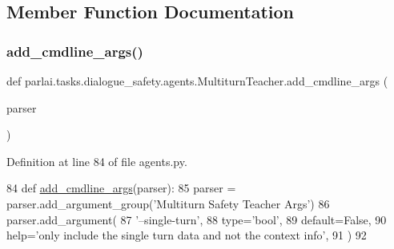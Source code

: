 \subsection{Member Function Documentation}
\mbox{\label{classparlai_1_1tasks_1_1dialogue__safety_1_1agents_1_1MultiturnTeacher_aa7d5691d1e80f9104f21698b8348b55e}} 
\subsubsection{\texorpdfstring{add\+\_\+cmdline\+\_\+args()}{add\_cmdline\_args()}}
{\footnotesize\ttfamily def parlai.\+tasks.\+dialogue\+\_\+safety.\+agents.\+Multiturn\+Teacher.\+add\+\_\+cmdline\+\_\+args (\begin{DoxyParamCaption}\item[{}]{parser }\end{DoxyParamCaption})\hspace{0.3cm}{\ttfamily [static]}}



Definition at line 84 of file agents.\+py.


\begin{DoxyCode}
84     \textcolor{keyword}{def }\hyperlink{namespaceparlai_1_1agents_1_1drqa_1_1config_a62fdd5554f1da6be0cba185271058320}{add\_cmdline\_args}(parser):
85         parser = parser.add\_argument\_group(\textcolor{stringliteral}{'Multiturn Safety Teacher Args'})
86         parser.add\_argument(
87             \textcolor{stringliteral}{'--single-turn'},
88             type=\textcolor{stringliteral}{'bool'},
89             default=\textcolor{keyword}{False},
90             help=\textcolor{stringliteral}{'only include the single turn data and not the context info'},
91         )
92 
\end{DoxyCode}
\mbox{\label{classparlai_1_1tasks_1_1dialogue__safety_1_1agents_1_1MultiturnTeacher_a75d52a7b90a5566b10803ad5d1c8acf0}} 
